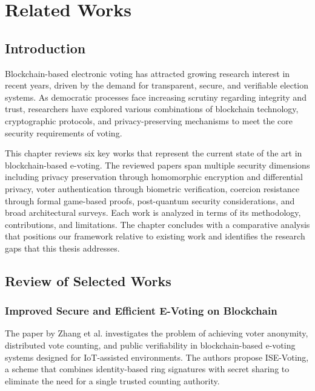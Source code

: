 \chapter{Related Works}
\label{ch:related-works}

\section{Introduction}
\label{sec:lit-intro}

Blockchain-based electronic voting has attracted growing research interest in recent years, driven by the demand for transparent, secure, and verifiable election systems. As democratic processes face increasing scrutiny regarding integrity and trust, researchers have explored various combinations of blockchain technology, cryptographic protocols, and privacy-preserving mechanisms to meet the core security requirements of voting.

This chapter reviews six key works that represent the current state of the art in blockchain-based e-voting. The reviewed papers span multiple security dimensions including privacy preservation through homomorphic encryption and differential privacy, voter authentication through biometric verification, coercion resistance through formal game-based proofs, post-quantum security considerations, and broad architectural surveys. Each work is analyzed in terms of its methodology, contributions, and limitations. The chapter concludes with a comparative analysis that positions our framework relative to existing work and identifies the research gaps that this thesis addresses.

\section{Review of Selected Works}
\label{sec:lit-review}

\subsection{Improved Secure and Efficient E-Voting on Blockchain}
\label{subsec:ise-voting}

The paper by Zhang et al. \cite{ise_voting} investigates the problem of achieving voter anonymity, distributed vote counting, and public verifiability in blockchain-based e-voting systems designed for IoT-assisted environments. The authors propose ISE-Voting, a scheme that combines identity-based ring signatures with secret sharing to eliminate the need for a single trusted counting authority.

